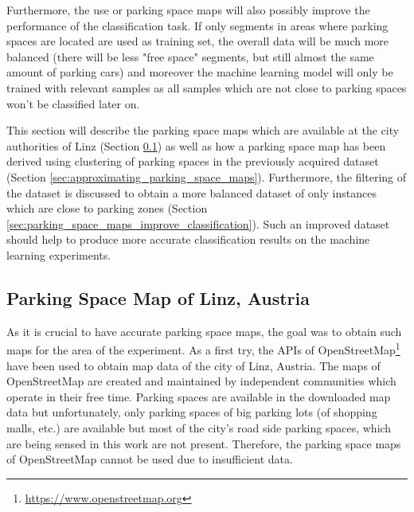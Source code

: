 Furthermore, the use or parking space maps will also possibly improve the performance of the classification task. If only segments in areas where parking spaces are located are used as training set, the overall data will be much more balanced (there will be less "free space" segments, but still almost the same amount of parking cars) and moreover the machine learning model will only be trained with relevant samples as all samples which are not close to parking spaces won't be classified later on.

This section will describe the parking space maps which are available at the city authorities of Linz (Section \ref{sec:parking_space_map_linz}) as well as how a parking space map has been derived using clustering of parking spaces in the previously acquired dataset (Section \ref{sec:approximating_parking_space_maps}). Furthermore, the filtering of the dataset is discussed to obtain a more balanced dataset of only instances which are close to parking zones (Section \ref{sec:parking_space_maps_improve_classification}). Such an improved dataset should help to produce more accurate classification results on the machine learning experiments.



\subsection{Parking Space Map of Linz, Austria}
\label{sec:parking_space_map_linz}

As it is crucial to have accurate parking space maps, the goal was to obtain such maps for the area of the experiment. As a first try, the APIs of OpenStreetMap\footnote{\url{https://www.openstreetmap.org}} have been used to obtain map data of the city of Linz, Austria. The maps of OpenStreetMap are created and maintained by independent communities which operate in their free time. Parking spaces are available in the downloaded map data but unfortunately, only parking spaces of big parking lots (of shopping malls, etc.) are available but most of the city's road side parking spaces, which are being sensed in this work are not present. Therefore, the parking space maps of OpenStreetMap cannot be used due to insufficient data.

